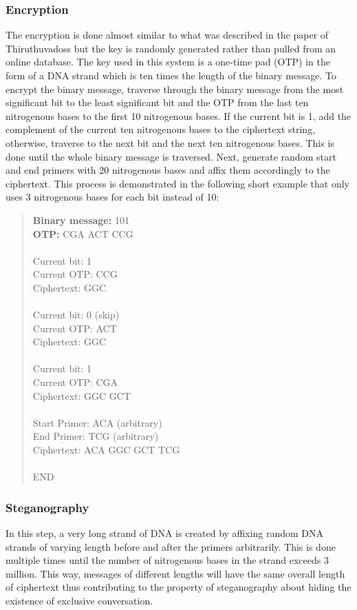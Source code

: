 \subsubsection{Encryption}
The encryption is done almost similar to what was described in the paper of Thiruthuvadoss but the key is randomly generated rather than pulled from an online database. The key used in this system is a one-time pad (OTP) in the form of a DNA strand which is ten times the length of the binary message. To encrypt the binary message, traverse through the binary message from the most significant bit to the least significant bit and the OTP from the last ten nitrogenous bases to the first 10 nitrogenous bases. If the current bit is 1, add the complement of the current ten nitrogenous bases to the ciphertext string, otherwise, traverse to the next bit and the next ten nitrogenous bases. This is done until the whole binary message is traversed. Next, generate random start and end primers with 20 nitrogenous bases and affix them accordingly to the ciphertext. This process is demonstrated in the following short example that only uses 3 nitrogenous bases for each bit instead of 10:
\begin{quote}
\textbf{Binary message:} 101\\
\textbf{OTP:} CGA ACT CCG\\
\\
Current bit: 1\\
Current OTP: CCG\\
Ciphertext: GGC\\
\\
Current bit: 0 (skip)\\
Current OTP: ACT\\
Ciphertext: GGC\\
\\
Current bit: 1\\
Current OTP: CGA\\
Ciphertext: GGC GCT\\
\\
Start Primer: ACA (arbitrary)\\
End Primer: TCG (arbitrary)\\
Ciphertext: ACA GGC GCT TCG\\
\\
END
\end{quote}
\subsubsection{Steganography}
In this step, a very long strand of DNA is created by affixing random DNA strands of varying length before and after the primers arbitrarily. This is done multiple times until the number of nitrogenous bases in the strand exceeds 3 million. This way, messages of different lengths will have the same overall length of ciphertext thus contributing to the property of steganography about hiding the existence of exclusive conversation.

